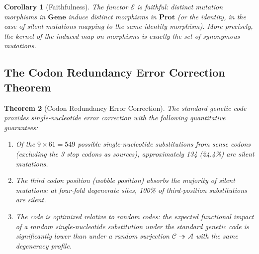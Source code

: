 \documentclass[12pt,a4paper]{article}
\newtheorem{theorem}{Theorem}[section]
\newtheorem{corollary}[theorem]{Corollary}
\theoremstyle{definition}
\newcommand{\cat}[1]{\mathbf{#1}}
\begin{document}
\begin{corollary}[Faithfulness]\label{cor:faithful}
The functor $\mathcal{E}$ is faithful: distinct mutation morphisms in $\cat{Gene}$ induce distinct morphisms in $\cat{Prot}$ (or the identity, in the case of silent mutations mapping to the same identity morphism). More precisely, the kernel of the induced map on morphisms is exactly the set of synonymous mutations.
\end{corollary}

\subsection{The Codon Redundancy Error Correction Theorem}

\begin{theorem}[Codon Redundancy Error Correction]\label{thm:error-correction}
The standard genetic code provides single-nucleotide error correction with the following quantitative guarantees:
\begin{enumerate}[label=(\roman*)]
  \item Of the $9 \times 61 = 549$ possible single-nucleotide substitutions from sense codons (excluding the 3 stop codons as sources), approximately 134 (24.4\%) are silent mutations.
  \item The third codon position (wobble position) absorbs the majority of silent mutations: at four-fold degenerate sites, 100\% of third-position substitutions are silent.
  \item The code is \emph{optimized} relative to random codes: the expected functional impact of a random single-nucleotide substitution under the standard genetic code is significantly lower than under a random surjection $\mathcal{C} \twoheadrightarrow \mathcal{A}$ with the same degeneracy profile.
\end{enumerate}
\end{theorem}
\end{document}

